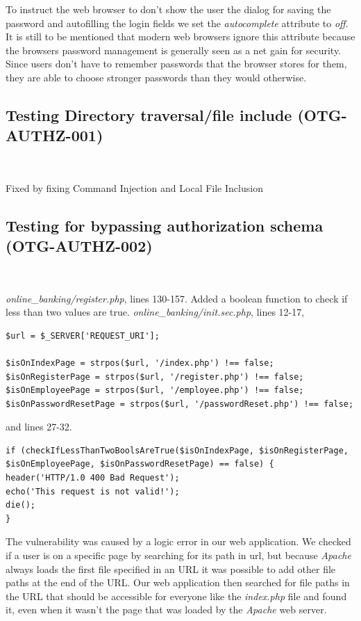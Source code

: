\documentclass[headsepline,footsepline,footinclude=false,oneside,fontsize=11pt,paper=a4,listof=totoc,bibliography=totoc]{scrbook} %
\begin{document}
To instruct the web browser to don't show the user the dialog for saving the password and autofilling the login fields we set the \textit{autocomplete} attribute to \textit{off}. \\

It is still to be mentioned that modern web browsers ignore this attribute because the browsers password management is generally seen as a net gain for security. Since users don't have to remember passwords that the browser stores for them, they are able to choose stronger passwords than they would otherwise. \\


\subsection{Testing Directory traversal/file include (OTG-AUTHZ-001)}\

Fixed by fixing Command Injection and Local File Inclusion

\pagebreak
\subsection{Testing for bypassing authorization schema (OTG-AUTHZ-002)}\

\textit{online\_banking/register.php}, lines 130-157. Added a boolean function to check if less than two values are true.
\textit{online\_banking/init.sec.php}, lines 12-17, 

\begin{lstlisting}
$url = $_SERVER['REQUEST_URI'];

$isOnIndexPage = strpos($url, '/index.php') !== false;
$isOnRegisterPage = strpos($url, '/register.php') !== false;
$isOnEmployeePage = strpos($url, '/employee.php') !== false;
$isOnPasswordResetPage = strpos($url, '/passwordReset.php') !== false;
\end{lstlisting} 
and lines 27-32. 
\begin{lstlisting}
if (checkIfLessThanTwoBoolsAreTrue($isOnIndexPage, $isOnRegisterPage, $isOnEmployeePage, $isOnPasswordResetPage) == false) {
header('HTTP/1.0 400 Bad Request');
echo('This request is not valid!');
die();
}
\end{lstlisting}
 
The vulnerability was caused by a logic error in our web application. We checked if a user is on a specific page by searching for its path in url, but because \textit{Apache} always loads the first file specified in an URL it was possible to add other file paths at the end of the URL. Our web application then searched for file paths in the URL that should be accessible for everyone like the \textit{index.php} file and found it, even when it wasn't the page that was loaded by the \textit{Apache} web server.
\end{document}
